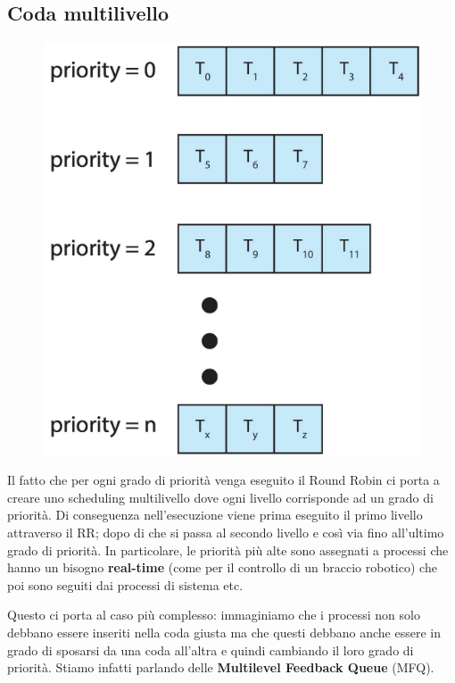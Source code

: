 \subsection{Coda multilivello}
\begin{figure}
  \includegraphics[width = \linewidth]{../res/imgs/CPU scheduling/multilevel_scheduling.png}
  \label{fig:multilevel_scheduling}
\end{figure}
Il fatto che per ogni grado di priorità venga eseguito il Round Robin ci porta a creare uno scheduling multilivello dove ogni livello corrisponde ad un grado di priorità. Di conseguenza nell'esecuzione viene prima eseguito il primo livello attraverso il RR; dopo di che si passa al secondo livello e così via fino all'ultimo grado di priorità. In particolare, le priorità più alte sono assegnati a processi che hanno un bisogno \textbf{real-time} (come per il controllo di un braccio robotico) che poi sono seguiti dai processi di sistema etc.

Questo ci porta al caso più complesso: immaginiamo che i processi non solo debbano essere inseriti nella coda giusta ma che questi debbano anche essere in grado di sposarsi da una coda all'altra e quindi cambiando il loro grado di priorità. Stiamo infatti parlando delle \textbf{Multilevel Feedback Queue} (MFQ).


